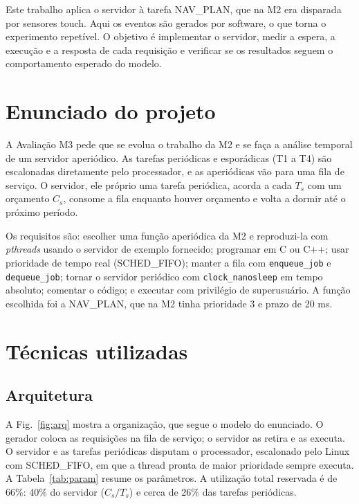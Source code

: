 \documentclass[conference,a4paper]{IEEEtran}
\begin{document}
Este trabalho aplica o servidor à tarefa NAV\_PLAN, que na M2 era disparada por sensores touch. Aqui os eventos são gerados por software, o que torna o experimento repetível. O objetivo é implementar o servidor, medir a espera, a execução e a resposta de cada requisição e verificar se os resultados seguem o comportamento esperado do modelo.

\section{Enunciado do projeto}
A Avaliação M3 pede que se evolua o trabalho da M2 e se faça a análise temporal de um servidor aperiódico. As tarefas periódicas e esporádicas (T1 a T4) são escalonadas diretamente pelo processador, e as aperiódicas vão para uma fila de serviço. O servidor, ele próprio uma tarefa periódica, acorda a cada $T_s$ com um orçamento $C_s$, consome a fila enquanto houver orçamento e volta a dormir até o próximo período.

Os requisitos são: escolher uma função aperiódica da M2 e reproduzi-la com \emph{pthreads} usando o servidor de exemplo fornecido; programar em C ou C++; usar prioridade de tempo real (SCHED\_FIFO); manter a fila com \texttt{enqueue\_job} e \texttt{dequeue\_job}; tornar o servidor periódico com \texttt{clock\_nanosleep} em tempo absoluto; comentar o código; e executar com privilégio de superusuário. A função escolhida foi a NAV\_PLAN, que na M2 tinha prioridade 3 e prazo de 20 ms.

\section{Técnicas utilizadas}

\subsection{Arquitetura}
A Fig.~\ref{fig:arq} mostra a organização, que segue o modelo do enunciado. O gerador coloca as requisições na fila de serviço; o servidor as retira e as executa. O servidor e as tarefas periódicas disputam o processador, escalonado pelo Linux com SCHED\_FIFO, em que a thread pronta de maior prioridade sempre executa. A Tabela~\ref{tab:param} resume os parâmetros. A utilização total reservada é de 66\%: 40\% do servidor ($C_s/T_s$) e cerca de 26\% das tarefas periódicas.
\end{document}

